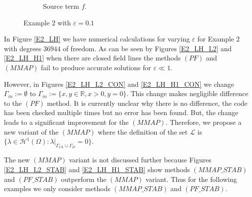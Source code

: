 \documentclass[12pt]{ociamthesis}
\begin{document}
\begin{figure}[H]
\begin{subfigure}{0.5\textwidth}
     \caption{Source term $f$.}
 \end{subfigure}
 \caption{Example $2$ with $\varepsilon = 0.1$} \label{E2_uf}
\end{figure}

In Figure \ref{E2_LH} we have numerical calculations for varying $\varepsilon$ for Example $2$ with degrees $36944$ of freedom. As can be seen by Figures \ref{E2_LH_L2} and \ref{E2_LH_H1} when there are closed field lines the methods $(PF)$ and $(MMAP)$ fail to produce accurate solutions for $\varepsilon \ll 1$.

However, in Figures \ref{E2_LH_L2_CON} and \ref{E2_LH_H1_CON} we change $\Gamma_{in} := \emptyset$ to $\Gamma_{in}:=\{x,y \in \mathbb{R}, x>0, y=0\}$. This change makes negligible difference to the $(PF)$ method. It is currently unclear why there is no difference, the code has been checked multiple times but no error has been found. But, the change leads to a significant improvement for the $(MMAP)$. Therefore, we propose a new variant of the $(MMAP)$ where the definition of the set $\mathcal{L}$ is $\{\lambda \in \mathcal{H}^1(\Omega): \lambda|_{\Gamma_{CL}\cup \Gamma_{D}}=0\}$.

The new $(MMAP)$ variant is not discussed further because Figures \ref{E2_LH_L2_STAB} and \ref{E2_LH_H1_STAB} show methods $(MMAP\_STAB)$ and $(PF\_STAB)$ outperform the $(MMAP)$ variant. Thus for the following examples we only consider methods $(MMAP\_STAB)$ and $(PF\_STAB)$.
\end{document}
